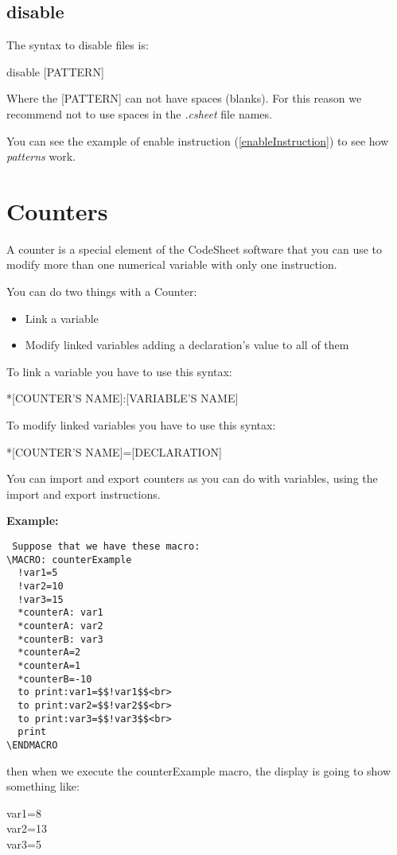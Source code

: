 \documentclass[11pt,a4paper,openright,oneside]{book}
\newenvironment{ex}
{
  \setlength{\parindent}{0cm}
  \large \textbf{Example:} \normalsize 
}
{}
\begin{document}
\subsection{\textsf{disable}}

The syntax to disable files is:
\begin{center} \textsf{disable \textsc{\scriptsize [PATTERN]}} \end{center}
Where the \textsc{\scriptsize[PATTERN]} can not have spaces (blanks). For this reason we recommend not to use spaces in the \textit{.csheet} file names.

You can see the example of \textsf{enable} instruction (\ref{enableInstruction}) to see how \textit{patterns} work.

\section{Counters}

A counter is a special element of the CodeSheet software that you can use to modify more than one numerical variable with only one instruction. 

You can do two things with a Counter:
\begin{itemize}
  \item Link a variable
  \item Modify linked variables adding a declaration's value to all of them
\end{itemize}

To link a variable you have to use this syntax:
\begin{center} \textsf{*\textsc{\scriptsize [COUNTER'S NAME]}:\textsc{\scriptsize [VARIABLE'S NAME]}} \end{center}

To modify linked variables you have to use this syntax:
\begin{center} \textsf{*\textsc{\scriptsize [COUNTER'S NAME]}=\textsc{\scriptsize [DECLARATION]}} \end{center}

You can import and export counters as you can do with variables, using the import and export instructions.

\begin{ex}
  \begin{lstlisting} Suppose that we have these macro:
\MACRO: counterExample
  !var1=5
  !var2=10
  !var3=15
  *counterA: var1
  *counterA: var2
  *counterB: var3
  *counterA=2
  *counterA=1
  *counterB=-10
  to print:var1=$$!var1$$<br>
  to print:var2=$$!var2$$<br>
  to print:var3=$$!var3$$<br>
  print
\ENDMACRO
  \end{lstlisting}

then when we execute the \textsf{counterExample} macro, the display is going to show something like:
\vspace{5px}

\textsf{var1=8 \\
var2=13 \\
var3=5} \\

\end{ex}
\end{document}

